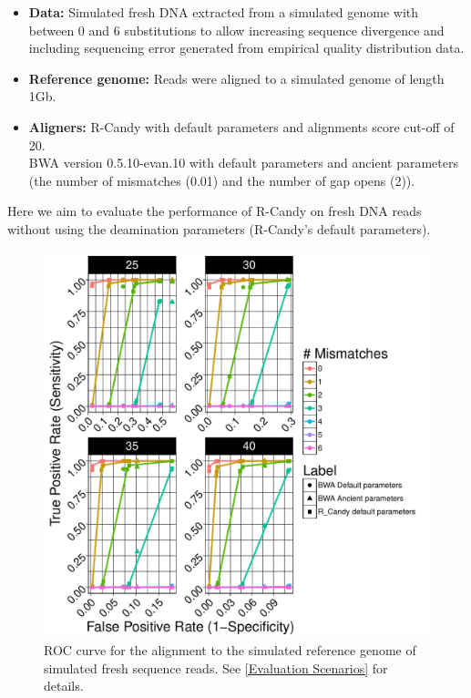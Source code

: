 \documentclass[11pt,a4paper]{report}
\begin{document}
  \begin{itemize}

   \item \textbf{Data:} Simulated fresh DNA extracted from a simulated genome 
   with between 0 and 6 substitutions to allow increasing sequence divergence
   and including sequencing error generated from empirical quality distribution data.
 
   
   \item \textbf{Reference genome:} Reads were aligned to a simulated genome of 
length 1Gb.

    \item \textbf{Aligners:} 
R-Candy with default parameters and alignments score cut-off of 20. \\
BWA version 0.5.10-evan.10 with default parameters and ancient parameters 
\cite{green2010draft} (the number of mismatches 
(0.01) and the number of gap opens (2)).

  \end{itemize}
 
Here we aim to evaluate the performance of R-Candy on fresh DNA reads 
without using the deamination parameters (R-Candy's default parameters).

\begin{figure}[H]
\centering
\includegraphics[width=12cm]{pictures/ROC_DS3_emp.pdf}

\caption{
ROC curve for the alignment to the simulated reference genome of simulated 
fresh sequence reads. See \ref{Evaluation Scenarios} for details.}

\label{DS3_emp}
\end{figure}
\end{document}
